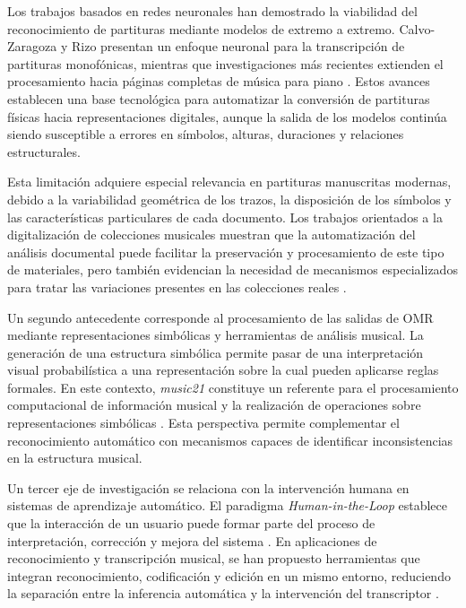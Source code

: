 \documentclass[conference]{IEEEtran}
\begin{document}
Los trabajos basados en redes neuronales han demostrado la viabilidad del
reconocimiento de partituras mediante modelos de extremo a extremo.
Calvo-Zaragoza y Rizo \cite{calvo2018} presentan un enfoque neuronal para la
transcripción de partituras monofónicas, mientras que investigaciones más
recientes extienden el procesamiento hacia páginas completas de música para
piano \cite{riosvila2026}. Estos avances establecen una base tecnológica
para automatizar la conversión de partituras físicas hacia representaciones
digitales, aunque la salida de los modelos continúa siendo susceptible a
errores en símbolos, alturas, duraciones y relaciones estructurales.

Esta limitación adquiere especial relevancia en partituras manuscritas
modernas, debido a la variabilidad geométrica de los trazos, la disposición
de los símbolos y las características particulares de cada documento. Los
trabajos orientados a la digitalización de colecciones musicales muestran
que la automatización del análisis documental puede facilitar la
preservación y procesamiento de este tipo de materiales, pero también
evidencian la necesidad de mecanismos especializados para tratar las
variaciones presentes en las colecciones reales \cite{ricordi2024}.

Un segundo antecedente corresponde al procesamiento de las salidas de OMR
mediante representaciones simbólicas y herramientas de análisis musical.
La generación de una estructura simbólica permite pasar de una interpretación
visual probabilística a una representación sobre la cual pueden aplicarse
reglas formales. En este contexto, \textit{music21} constituye un referente
para el procesamiento computacional de información musical y la realización
de operaciones sobre representaciones simbólicas
\cite{cuthbert2010}. Esta perspectiva permite complementar el
reconocimiento automático con mecanismos capaces de identificar
inconsistencias en la estructura musical.

Un tercer eje de investigación se relaciona con la intervención humana en
sistemas de aprendizaje automático. El paradigma
\textit{Human-in-the-Loop} establece que la interacción de un usuario puede
formar parte del proceso de interpretación, corrección y mejora del sistema
\cite{amershi2014}. En aplicaciones de reconocimiento y transcripción
musical, se han propuesto herramientas que integran reconocimiento,
codificación y edición en un mismo entorno, reduciendo la separación entre
la inferencia automática y la intervención del transcriptor
\cite{rizo2023}.
\end{document}
